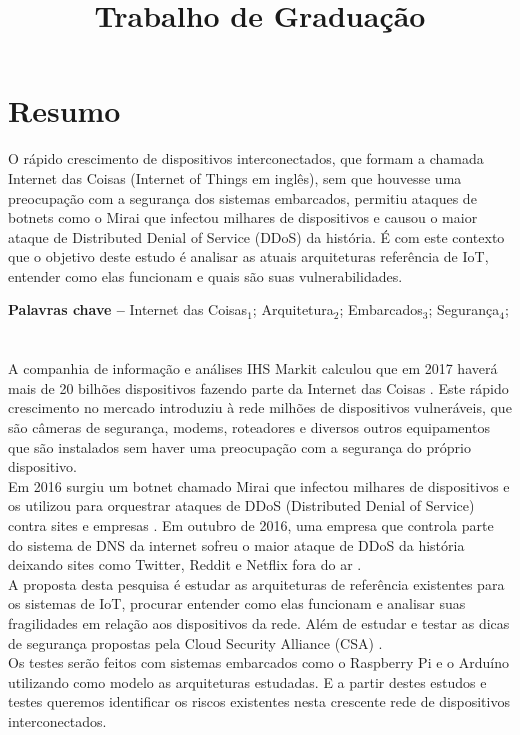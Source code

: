 \documentclass[12pt, a4paper]{article}
\begin{document}
\title{Trabalho de Graduação}
\makeourtitle

\tableofcontents

\newpage
\section*{Resumo}

O rápido crescimento de dispositivos interconectados, que formam a chamada Internet das Coisas (Internet of Things em inglês), sem que houvesse uma preocupação com a segurança dos sistemas embarcados, permitiu ataques de botnets como o Mirai que infectou milhares de dispositivos e causou o maior ataque de Distributed Denial of Service (DDoS) da história. É com este contexto que o objetivo deste estudo é analisar as atuais arquiteturas referência de IoT, entender como elas funcionam e quais são suas vulnerabilidades.


\textbf{Palavras chave --} Internet das Coisas$_1$; Arquitetura$_2$; Embarcados$_3$; Segurança$_4$;

%


\newpage
\section{\sectionI}
\label{sec:intro}

A companhia de informação e análises IHS Markit calculou que em 2017 haverá mais de 20 bilhões dispositivos fazendo parte da Internet das Coisas \cite{IHSMarkitTrend}. Este rápido crescimento no mercado introduziu à rede milhões de dispositivos vulneráveis, que são câmeras de segurança, modems, roteadores e diversos outros equipamentos que são instalados sem haver uma preocupação com a segurança do próprio dispositivo.
\\Em 2016 surgiu um botnet chamado Mirai que infectou milhares de dispositivos e os utilizou para orquestrar ataques de DDoS (Distributed Denial of Service) contra sites e empresas \cite{Mirai_Wired}. Em outubro de 2016, uma empresa que controla parte do sistema de DNS da internet sofreu o maior ataque de DDoS da história deixando sites como Twitter, Reddit e Netflix fora do ar \cite{Mirai_Guardian}.
\\A proposta desta pesquisa é estudar as arquiteturas de referência existentes para os sistemas de IoT, procurar entender como elas funcionam e analisar suas fragilidades em relação aos dispositivos da rede. Além de estudar e testar as dicas de segurança propostas pela Cloud Security Alliance (CSA) \cite{13steps}.
\\Os testes serão feitos com sistemas embarcados como o Raspberry Pi e o Arduíno utilizando como modelo as arquiteturas estudadas. E a partir destes estudos e testes queremos identificar os riscos existentes nesta crescente rede de dispositivos interconectados.
\newpage
\end{document}
